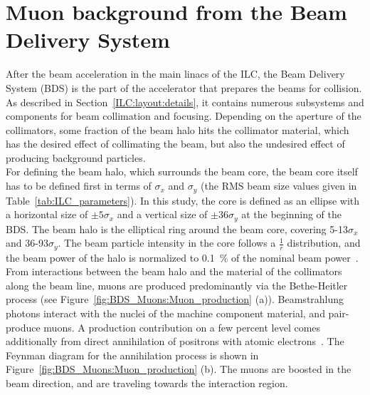 \section{Muon background from the Beam Delivery System}
\label{BDS_Muons}
After the beam acceleration in the main linacs of the ILC, the Beam Delivery System (BDS) is the part of the accelerator that prepares the beams for collision.
As described in Section~\ref{ILC:layout:details}, it contains numerous subsystems and components for beam collimation and focusing. 
Depending on the aperture of the collimators, some fraction of the beam halo hits the collimator material, which has the desired effect of collimating the beam, but also the undesired effect of producing background particles.
\\For defining the beam halo, which surrounds the beam core, the beam core itself has to be defined first in terms of $\sigma_x$ and $\sigma_y$ (the RMS beam size values given in Table~\ref{tab:ILC_parameters}).
In this study, the core is defined as an ellipse with a horizontal size of $\pm 5\sigma_x$ and a vertical size of $\pm 36\sigma_y$ at the beginning of the BDS.
The beam halo is the elliptical ring around the beam core, covering 5-13$\sigma_x$ and 36-93$\sigma_y$.
The beam particle intensity in the core follows a $\frac{1}{r}$ distribution, and the beam power of the halo is normalized to \SI{0.1}{\percent} of the nominal beam power~\cite{Glens_muon_talk}.
\\From interactions between the beam halo and the material of the collimators along the beam line, muons are produced predominantly via the Bethe-Heitler process (see Figure~\ref{fig:BDS_Muons:Muon_production} (a)).
Beamstrahlung photons interact with the nuclei of the machine component material, and pair-produce muons.
A production contribution on a few percent level comes additionally from direct annihilation of positrons with atomic electrons~\cite{MuonBkg_1TeV}.
The Feynman diagram for the annihilation process is shown in Figure~\ref{fig:BDS_Muons:Muon_production} (b).
The muons are boosted in the beam direction, and are traveling towards the interaction region.\\
